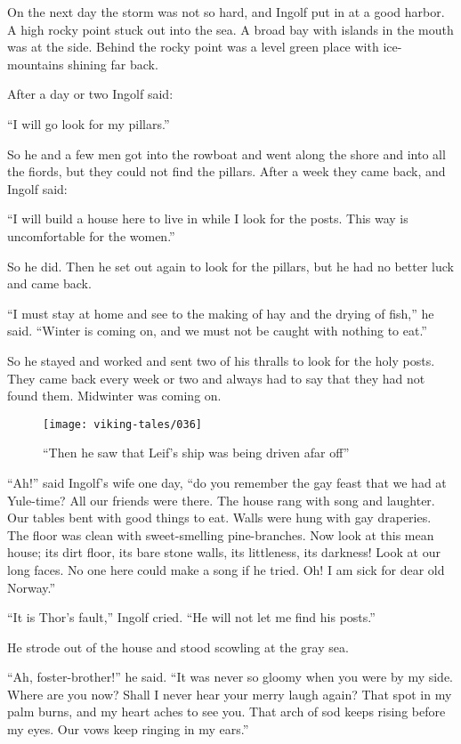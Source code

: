 On the next day the storm was not so hard, and Ingolf put in at a good
harbor. A high rocky point stuck out into the sea. A broad bay with
islands in the mouth was at the side. Behind the rocky point was a level
green place with ice-mountains shining far back.

After a day or two Ingolf said:

``I will go look for my pillars.''

So he and a few men got into the rowboat and went along the shore and
into all the fiords, but they could not find the pillars. After a week
they came back, and Ingolf said:

``I will build a house here to live in while I look for the posts. This
way is uncomfortable for the women.''

So he did. Then he set out again to look for the pillars, but he had no
better luck and came back.

``I must stay at home and see to the making of hay and the drying of
fish,'' he said. ``Winter is coming on, and we must not be caught with
nothing to eat.''

So he stayed and worked and sent two of his thralls to look for the holy
posts. They came back every week or two and always had to say that they
had not found them. Midwinter was coming on.

\begin{figure}
    \centering
    \texttt{[image: viking-tales/036]}
    \caption{``Then he saw that Leif's ship was being driven afar off''}
\end{figure}

``Ah!'' said Ingolf's wife one day, ``do you remember the gay feast that
we had at Yule-time? All our friends were there. The house rang with
song and laughter. Our tables bent with good things to eat. Walls were
hung with gay draperies. The floor was clean with sweet-smelling
pine-branches. Now look at this mean house; its dirt floor, its bare
stone walls, its littleness, its darkness! Look at our long faces. No
one here could make a song if he tried. Oh! I am sick for dear old
Norway.''

``It is Thor's fault,'' Ingolf cried. ``He will not let me find his
posts.''

He strode out of the house and stood scowling at the gray sea.

``Ah, foster-brother!'' he said. ``It was never so gloomy when you were
by my side. Where are you now? Shall I never hear your merry laugh
again? That spot in my palm burns, and my heart aches to see you. That
arch of sod keeps rising before my eyes. Our vows keep ringing in my
ears.''


